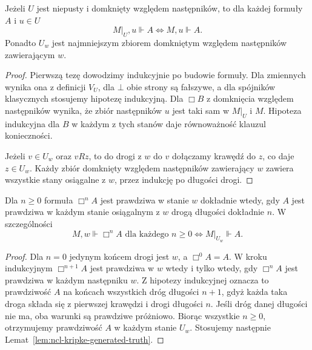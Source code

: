 \begin{lemat}
\label{lem:ncl-kripke-generated-truth}
Jeżeli $U$ jest niepusty i domknięty względem
następników, to dla każdej formuły $A$ i $u\in U$
\[
 M|_U,u\Vdash A\iff M,u\Vdash A.
\]
Ponadto $U_w$ jest najmniejszym zbiorem
domkniętym względem następników zawierającym $w$.
\end{lemat}
\begin{proof}
Pierwszą tezę dowodzimy indukcyjnie po budowie
formuły. Dla zmiennych wynika ona z definicji
$V_U$, dla $\bot$ obie strony są fałszywe,
a dla spójników klasycznych stosujemy
hipotezę indukcyjną.
Dla $\Box B$ z domknięcia względem następników
wynika, że zbiór następników $u$ jest taki sam
w $M|_U$ i $M$. Hipoteza indukcyjna dla $B$
w każdym z tych stanów daje równoważność
klauzul konieczności.

Jeżeli $v\in U_w$ oraz $vRz$, to do drogi
z $w$ do $v$ dołączamy krawędź do $z$,
co daje $z\in U_w$. Każdy zbiór domknięty
względem następników zawierający $w$
zawiera wszystkie stany osiągalne z $w$,
przez indukcję po długości drogi.
\end{proof}

\begin{lemat}
\label{lem:ncl-kripke-box-paths}
Dla $n\geq0$ formuła $\Box^n A$ jest
prawdziwa w stanie $w$ dokładnie wtedy,
gdy $A$ jest prawdziwa w każdym stanie
osiągalnym z $w$ drogą długości dokładnie $n$.
W szczególności
\[
 M,w\Vdash\Box^n A\text{ dla każdego }n\geq0
 \iff M|_{U_w}\Vdash A.
\]
\end{lemat}
\begin{proof}
Dla $n=0$ jedynym końcem drogi jest $w$,
a $\Box^0 A=A$. W kroku indukcyjnym
$\Box^{n+1}A$ jest prawdziwa w $w$ wtedy
i tylko wtedy, gdy $\Box^n A$ jest prawdziwa
w każdym następniku $w$. Z hipotezy indukcyjnej
oznacza to prawdziwość $A$ na końcach wszystkich
dróg długości $n+1$, gdyż każda taka droga
składa się z pierwszej krawędzi i drogi
długości $n$.
Jeśli dróg danej długości nie ma, oba warunki
są prawdziwe próżniowo.
Biorąc wszystkie $n\geq0$, otrzymujemy
prawdziwość $A$ w każdym stanie $U_w$.
Stosujemy następnie
Lemat~\ref{lem:ncl-kripke-generated-truth}.
\end{proof}

